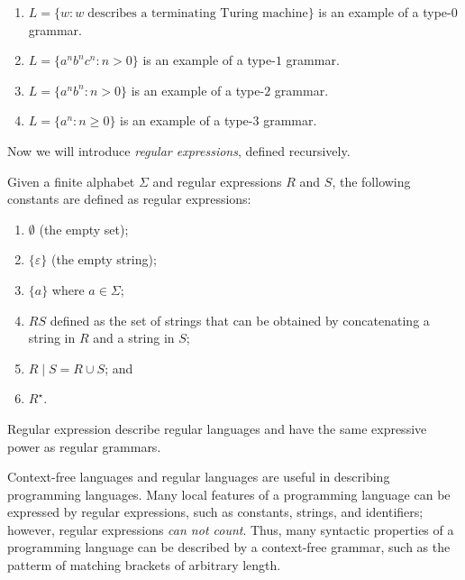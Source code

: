 \begin{example}
    \hfill
    \begin{enumerate}
        \item $L = \{ w : w \;\text{describes a terminating
            Turing machine}\}$ is an example of a type-$0$ grammar.
        \item $L = \{a^nb^nc^n : n > 0\}$ is an example of a
            type-$1$ grammar.
        \item $L = \{a^nb^n : n > 0\}$ is an example of a type-$2$
            grammar.
        \item $L = \{a^n: n \geq 0\}$ is an example of a type-$3$
            grammar.
    \end{enumerate}
\end{example}

Now we will introduce \emph{regular expressions}, defined recursively.

\begin{definition}
    Given a finite alphabet $\Sigma$ and regular expressions $R$ and $S$, 
    the following constants are defined as regular expressions:
    \begin{enumerate}
        \item $\emptyset$ (the empty set);
        \item $\{\varepsilon\}$ (the empty string);
        \item $\{a\}$ where $a \in \Sigma$;
        \item $RS$ defined as the set of strings that can be obtained
            by concatenating a string in $R$ and a string in $S$;
        \item $R \mid S = R \cup S$; and
        \item $R^\star$.
    \end{enumerate}
\end{definition}

\begin{theorem}[]
    Regular expression describe regular languages and have the same
    expressive power as regular grammars.
\end{theorem}

\begin{remark}
    Context-free languages and regular languages are useful in describing
    programming languages.
    Many local features of a programming language can be expressed by
    regular expressions, such as constants, strings, and identifiers;
    however, regular expressions \emph{can not count}.
    Thus, many syntactic properties of a programming language can be
    described by a context-free grammar, such as the patterm of
    matching brackets of arbitrary length.
\end{remark}

